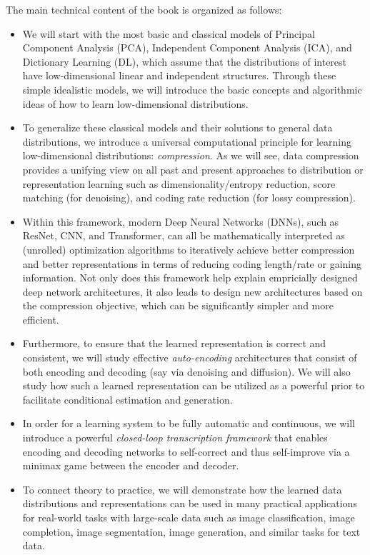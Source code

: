 \documentclass[\toplevelprefix/book-main.tex]{subfiles}
\begin{document}
The main technical content of the book is organized as follows:
\begin{itemize}
\item We will start with the most basic and classical models of Principal Component Analysis (PCA), Independent Component Analysis (ICA), and Dictionary Learning (DL), which assume that the distributions of interest have low-dimensional linear and independent structures. Through these simple idealistic models, we will introduce the basic concepts and algorithmic ideas of how to learn low-dimensional distributions.

\item To generalize these classical models and their solutions to general data distributions, we introduce a universal computational principle for learning low-dimensional distributions: {\em compression}. As we will see, data compression provides a unifying view on all past and present approaches to distribution or representation learning such as dimensionality/entropy reduction, score matching (for denoising), and coding rate reduction (for lossy compression). 

\item Within this framework, modern Deep Neural Networks (DNNs), such as ResNet, CNN, and Transformer, can all be mathematically interpreted as (unrolled) optimization algorithms to iteratively achieve better compression and better representations in terms of reducing coding length/rate or gaining information. Not only does this framework help explain empricially designed deep network architectures, it also leads to design new architectures based on the compression objective, which can be significantly simpler and more efficient.

\item Furthermore, to ensure that the learned representation is correct and consistent, we will study effective {\em auto-encoding} architectures that consist of both encoding and decoding (say via denoising and diffusion). We will also study how such a learned representation can be utilized as a powerful prior to facilitate conditional estimation and generation. 

\item In order for a learning system to be fully automatic and continuous, we will introduce a powerful {\em closed-loop transcription framework} that enables encoding and decoding networks to self-correct and thus self-improve via a minimax game between the encoder and decoder. 

\item To connect theory to practice, we will demonstrate how the learned data distributions and representations can be used in many practical applications for real-world tasks with large-scale data such as image classification, image completion, image segmentation, image generation, and similar tasks for text data. 
\end{itemize}
\end{document}
